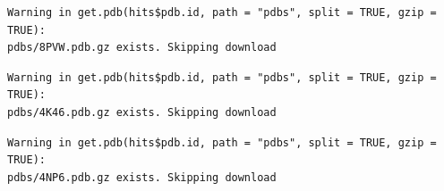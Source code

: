 \documentclass[
  letterpaper,
  DIV=11,
  numbers=noendperiod]{scrartcl}
\begin{document}
\begin{verbatim}
Warning in get.pdb(hits$pdb.id, path = "pdbs", split = TRUE, gzip = TRUE):
pdbs/8PVW.pdb.gz exists. Skipping download
\end{verbatim}

\begin{verbatim}
Warning in get.pdb(hits$pdb.id, path = "pdbs", split = TRUE, gzip = TRUE):
pdbs/4K46.pdb.gz exists. Skipping download
\end{verbatim}

\begin{verbatim}
Warning in get.pdb(hits$pdb.id, path = "pdbs", split = TRUE, gzip = TRUE):
pdbs/4NP6.pdb.gz exists. Skipping download
\end{verbatim}

\begin{verbatim}


\end{verbatim}
\end{document}
